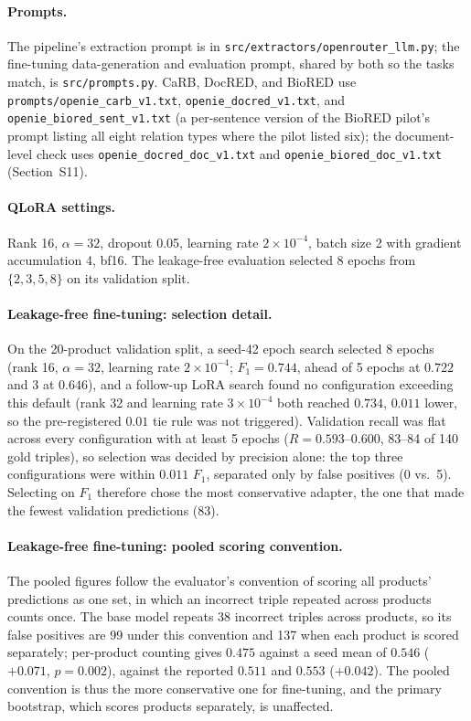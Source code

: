 \documentclass[11pt]{article}
\begin{document}
\begin{sloppypar}
\paragraph{Prompts.} The pipeline's extraction prompt is in
\texttt{src/extractors/openrouter\_llm.py}; the fine-tuning
data-generation and evaluation prompt, shared by both so the tasks
match, is \texttt{src/prompts.py}. CaRB, DocRED, and BioRED use
\texttt{prompts/openie\_carb\_v1.txt}, \texttt{openie\_docred\_v1.txt},
and \texttt{openie\_biored\_sent\_v1.txt} (a per-sentence version of the
BioRED pilot's prompt listing all eight relation types where the pilot
listed six); the document-level check uses
\texttt{openie\_docred\_doc\_v1.txt} and \texttt{openie\_biored\_doc\_v1.txt}
(Section~S11).
\end{sloppypar}

\paragraph{QLoRA settings.} Rank 16, $\alpha=32$, dropout 0.05, learning
rate $2\times10^{-4}$, batch size 2 with gradient accumulation 4, bf16.
The leakage-free evaluation selected 8 epochs from $\{2,3,5,8\}$ on its
validation split.

\paragraph{Leakage-free fine-tuning: selection detail.} On the
20-product validation split, a seed-42 epoch search selected 8 epochs
(rank 16, $\alpha=32$, learning rate $2\times10^{-4}$; $F_1=0.744$, ahead
of 5 epochs at $0.722$ and 3 at $0.646$), and a follow-up LoRA search
found no configuration exceeding this default (rank 32 and learning rate
$3\times10^{-4}$ both reached $0.734$, $0.011$ lower, so the
pre-registered $0.01$ tie rule was not triggered). Validation recall was
flat across every configuration with at least 5 epochs
($R=0.593$--$0.600$, 83--84 of 140 gold triples), so selection was
decided by precision alone: the top three configurations were within
$0.011$ $F_1$, separated only by false positives (0 vs.\ 5). Selecting on
$F_1$ therefore chose the most conservative adapter, the one that made
the fewest validation predictions (83).

\paragraph{Leakage-free fine-tuning: pooled scoring convention.} The
pooled figures follow the evaluator's convention of scoring all
products' predictions as one set, in which an incorrect triple repeated
across products counts once. The base model repeats 38 incorrect
triples across products, so its false positives are 99 under this
convention and 137 when each product is scored separately; per-product
counting gives $0.475$ against a seed mean of $0.546$ ($+0.071$,
$p=0.002$), against the reported $0.511$ and $0.553$ ($+0.042$). The
pooled convention is thus the more conservative one for fine-tuning,
and the primary bootstrap, which scores products separately, is
unaffected.
\end{document}
